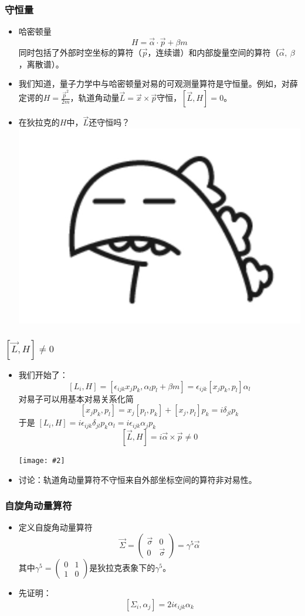 \documentclass[aspectratio=1610,14pt,matheuler]{beamer}
\newcommand{\bch}{}
\newcommand{\ech}{}
\newcommand{\mat}[1]{\begin{pmatrix}#1\end{pmatrix}}
\newcommand{\cpic}[2]{
\begin{center}
\texttt{[image: \#2]}
\end{center}
}
\begin{document}
\begin{frame}
\frametitle{\bch 守恒量 \ech}
\bch
\begin{itemize}
\item 哈密顿量
$$
H = \vec \alpha \cdot \vec p + \beta m
$$
同时包括了外部时空坐标的算符（$\vec p$，连续谱）和内部旋量空间的算符（$\vec \alpha,\ \beta$，离散谱）。
\item 我们知道，量子力学中与哈密顿量对易的可观测量算符是守恒量。例如，对薛定谔的$H = \frac{\vec p^2}{2m}$，轨道角动量$\vec L = \vec x \times \vec p$守恒，$[\vec  L, H ] =0$。
\item 在狄拉克的$H$中，$\vec L$还守恒吗？\includegraphics[scale=0.12]{speechless}

\end{itemize}
\ech
\end{frame}

\begin{frame}
\frametitle{\bch $[\vec L,H] \not= 0$ \ech}
\bch
\begin{itemize}
\item 我们开始了：
$$
[L_i,H] = [\epsilon_{ijk} x_j p_k,\alpha_l p_l + \beta m] = \epsilon_{ijk}[x_j p_k,p_l]\alpha_l
$$
对易子可以用基本对易关系化简
$$
[x_j p_k,p_l]  = x_j[p_l,p_k]+[x_j,p_l]p_k = i\delta_{jl}p_k
$$
于是
$
[L_i,H] = i \epsilon_{ijk} \delta_{jl}p_k \alpha_l =  i \epsilon_{ijk} \alpha_j p_k
$
$$
[\vec L,H] = i \vec \alpha \times \vec p \not= 0
$$
\cpic{0.2}{oops}
\item 讨论：轨道角动量算符不守恒来自外部坐标空间的算符非对易性。
\end{itemize}
\ech
\end{frame}

\begin{frame}
\frametitle{\bch 自旋角动量算符 \ech}
\bch
\begin{itemize}
\item
定义自旋角动量算符
$$\vec \varSigma = \mat{\vec \sigma & 0 \\ 0 & \vec \sigma} = \gamma^5 \vec \alpha$$
其中$\gamma^5 = \mat{0 & 1 \\ 1 &0}$是狄拉克表象下的$\gamma^5$。
\item
先证明：
$$[\varSigma_i,\alpha_j] = 2i\epsilon_{ijk} \alpha_k$$
\end{itemize}
\ech
\end{frame}
\end{document}

